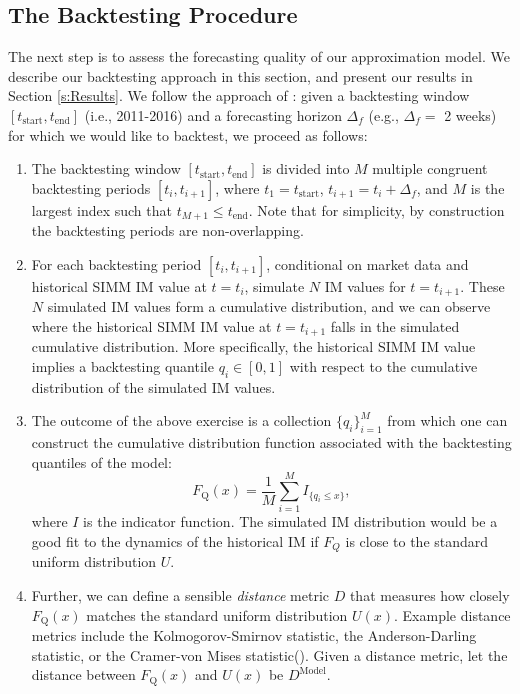 \documentclass[preprint,12pt]{elsarticle}
\begin{document}
\subsection{The Backtesting Procedure}\label{s:BacktestingProcedure}

The next step is to assess the forecasting quality of our approximation model. We describe our backtesting approach in this section, and present our results in Section \ref{s:Results}. We follow the approach of \citep{ruiz2014backtesting}: given a backtesting window $[t_{\textrm{start}}, t_{\textrm{end}}]$ (i.e., 2011-2016) and a forecasting horizon $\Delta_f$ (e.g., $\Delta_f=$ 2 weeks) for which we would like to backtest, we proceed as follows:
\begin{enumerate}
\item The backtesting window $[t_{\textrm{start}}, t_{\textrm{end}}]$ is divided into $M$ multiple congruent backtesting periods $[t_i, t_{i+1}]$, where $t_1 = t_{\textrm{start}}$, $t_{i+1} = t_i + \Delta_f$, and $M$ is the largest index such that $t_{M+1} \le t_{\textrm{end}}$. Note that for simplicity, by construction the backtesting periods are non-overlapping. \\
\item For each backtesting period $[t_i, t_{i+1}]$, conditional on market data and historical SIMM IM value at $t = t_i$, simulate $N$ IM values for $t=t_{i+1}$. These $N$ simulated IM values form a cumulative distribution, and we can observe where the historical SIMM IM value at $t=t_{i+1}$ falls in the simulated cumulative distribution. More specifically, the historical SIMM IM value implies a backtesting quantile $q_i\in [0, 1]$ with respect to the cumulative distribution of the simulated IM values.
\item The outcome of the above exercise is a collection $\{q_i\}_{i=1}^{M}$ from which one can construct the cumulative distribution function associated with the backtesting quantiles of the model:
\begin{equation}
F_{\textrm{Q}}(x)=\frac{1}{M}\sum_{i=1}^{M}I_{\{q_i\le x\}},
\end{equation}
where $I$ is the indicator function. The simulated IM distribution would be a good fit to the dynamics of the historical IM if $F_Q$ is close to the standard uniform distribution $U$.

\item Further, we can define a sensible \emph{distance} metric $D$ that measures how closely $F_{\textrm{Q}}(x)$ matches the standard uniform distribution $U(x)$. Example distance metrics include the Kolmogorov-Smirnov statistic, the Anderson-Darling statistic, or the Cramer-von Mises statistic(\citep{ruiz2014backtesting}). Given a distance metric, let the distance between $F_{\textrm{Q}}(x)$ and $U(x)$ be $D^{\textrm{Model}}$.


\end{enumerate}
\end{document}
